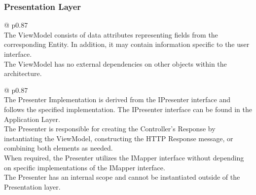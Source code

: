 \subsubsection*{Presentation Layer}
\begin{table}[H]
    \begin{tabular}{@{\makebox[2em][c]{\rownumber\space}}  p{0.87\linewidth}}
        \\ 
        \hline
        The ViewModel consists of data attributes representing fields from the
        corresponding Entity. In addition, it may contain information specific to the user
        interface. \\

        The ViewModel has no external dependencies on other objects within the
        architecture. \\
       
       \hline
    \end{tabular}
\caption{ViewModel Requirements}
\label{table_requirements_viewmodel}
\end{table}

\begin{table}[H]
    \begin{tabular}{@{\makebox[2em][c]{\rownumber\space}}  p{0.87\linewidth}}
        \\ 
    \hline
    The Presenter Implementation is derived from the IPresenter interface and follows the
    specified implementation. The IPresenter interface can be found in the Application
    Layer. \\   
    
    The Presenter is responsible for creating the Controller's Response by instantiating
    the ViewModel, constructing the HTTP Response message, or combining both elements as
    needed. \\
    
    When required, the Presenter utilizes the IMapper interface without depending on
    specific implementations of the IMapper interface. \\
    
    The Presenter has an internal scope and cannot be instantiated outside of the
    Presentation layer. \\
    \hline
    \end{tabular}
\caption{Presenter Requirements}
\label{table_requirements_presenter}
\end{table}

